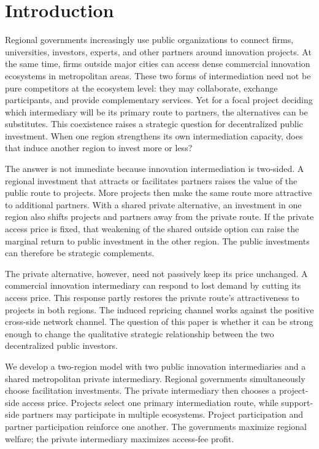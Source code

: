 \section{Introduction}\label{sec:introduction}

Regional governments increasingly use public organizations to connect firms, universities, investors, experts, and other partners around innovation projects. At the same time, firms outside major cities can access dense commercial innovation ecosystems in metropolitan areas. These two forms of intermediation need not be pure competitors at the ecosystem level: they may collaborate, exchange participants, and provide complementary services. Yet for a focal project deciding which intermediary will be its primary route to partners, the alternatives can be substitutes. This coexistence raises a strategic question for decentralized public investment. When one region strengthens its own intermediation capacity, does that induce another region to invest more or less?

The answer is not immediate because innovation intermediation is two-sided. A regional investment that attracts or facilitates partners raises the value of the public route to projects. More projects then make the same route more attractive to additional partners. With a shared private alternative, an investment in one region also shifts projects and partners away from the private route. If the private access price is fixed, that weakening of the shared outside option can raise the marginal return to public investment in the other region. The public investments can therefore be strategic complements.

The private alternative, however, need not passively keep its price unchanged. A commercial innovation intermediary can respond to lost demand by cutting its access price. This response partly restores the private route's attractiveness to projects in both regions. The induced repricing channel works against the positive cross-side network channel. The question of this paper is whether it can be strong enough to change the qualitative strategic relationship between the two decentralized public investors.

We develop a two-region model with two public innovation intermediaries and a shared metropolitan private intermediary. Regional governments simultaneously choose facilitation investments. The private intermediary then chooses a project-side access price. Projects select one primary intermediation route, while support-side partners may participate in multiple ecosystems. Project participation and partner participation reinforce one another. The governments maximize regional welfare; the private intermediary maximizes access-fee profit.

